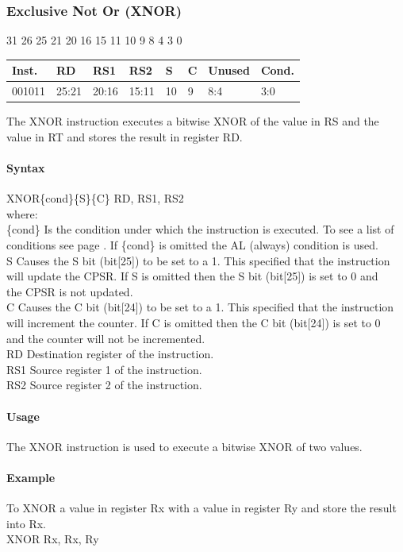 \documentclass[12pt]{article}
\newcommand{\aTypeInstruction}[6]
{%
    \hspace{1.6cm}31 \hspace{1.15cm}26 \hspace{.04cm}25 \hspace{.8cm}21 \hspace{.04cm}20 \hspace{.8cm}16 \hspace{.04cm}15 \hspace{.8cm}11 \hspace{.04cm}10 \hspace{.275cm}9 \hspace{.275cm}8 \hspace{1.175cm}4 \hspace{.04cm}3 \hspace{1.25cm}0
    \vspace{-.25cm}
    \begin{center}
        \begin{tabular}{ |p{1.8cm}|p{1.5cm}|p{1.5cm}|p{1.5cm}|p{0.3cm}|p{0.3cm}|p{1.5cm}|p{1.5cm}| }
            \hline
            \textbf{Inst.} & \textbf{RD}& \textbf{RS1} & \textbf{RS2} & \textbf{S} & \textbf{C} & Unused & \textbf{Cond.}\\
            \hline
            #1 & 25:21 & 20:16 & 15:11 & 10 & 9 & 8:4 &3:0\\
            \hline
        \end{tabular}
    \end{center}
    
    \noindent
    #2\\
    
    \paragraph{Syntax}
    \begin{flushleft}
    #3\{cond\}\{S\}\{C\} RD, RS1, RS2\\
    \vspace{1em}        %
    where:\\
    \vspace{1em}
    \{cond\}    \hspace{2em} Is the condition under which the instruction is executed. To see a list of\\
                \hspace{5.4em} conditions see page . If \{cond\} is omitted the AL (always) condition is used.\\
    \vspace{1em}    
    S       \hspace{4.5em} Causes the S bit (bit[25]) to be set to a 1. This specified that the instruction\\
            \hspace{5.4em} will update the CPSR. If S is omitted then the S bit (bit[25]) is set to 0 and\\
            \hspace{5.4em} the CPSR is not updated.\\
    \vspace{1em}    
    C       \hspace{4.5em} Causes the C bit (bit[24]) to be set to a 1. This specified that the instruction\\
            \hspace{5.4em} will increment the counter. If C is omitted then the C bit (bit[24]) is set to 0\\
            \hspace{5.4em} and the counter will not be incremented.\\
    \vspace{1em}
    RD  \hspace{3.6em} Destination register of the instruction.\\
    \vspace{1em}
    RS1  \hspace{3.35em} Source register 1 of the instruction.\\
    \vspace{1em}
    RS2  \hspace{3.35em} Source register 2 of the instruction.\\
    \end{flushleft}
    
    \paragraph{Usage}
    \begin{flushleft}
    #4\\
    \end{flushleft}
    \paragraph{Example}
    \begin{flushleft}
    #5\\
    \vspace{1em}
    #6
    \end{flushleft}
    }
\begin{document}
   
   




    \newpage
    \subsubsection{Exclusive Not Or (XNOR)}
    
    \aTypeInstruction
    {001011}
    {The XNOR instruction executes a bitwise XNOR of the value in RS and the value in RT and stores the result in register RD.}
    {XNOR}
    {The XNOR instruction is used to execute a bitwise XNOR of two values.}
    {To XNOR a value in register Rx with a value in register Ry and store the result into Rx.}
    {XNOR Rx, Rx, Ry}
    
    
\end{document}
